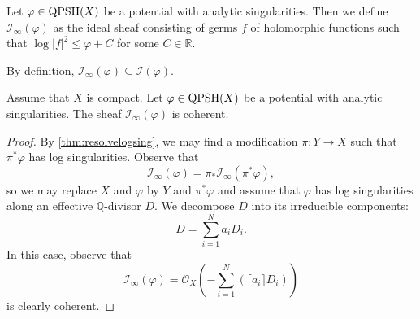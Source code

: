 \begin{definition}\label{def:Iinfty}
    Let $\varphi\in \mathrm{QPSH}(X)$ be a potential with analytic singularities. Then we define $\mathcal{I}_{\infty}(\varphi)$  as the ideal sheaf consisting of germs $f$ of holomorphic functions such that $\log |f|^2\leq \varphi+C$ for some $C\in \mathbb{R}$.
\end{definition}
By definition, $\mathcal{I}_{\infty}(\varphi)\subseteq \mathcal{I}(\varphi)$.

\begin{lemma}\label{lma:pshfunctions:L1494}
    Assume that $X$ is compact. Let $\varphi\in \mathrm{QPSH}(X)$ be a potential with analytic singularities.
    The sheaf $\mathcal{I}_{\infty}(\varphi)$ is coherent.
\end{lemma}
\begin{proof}
    By \cref{thm:resolvelogsing}, we may find a modification $\pi\colon Y\rightarrow X$ such that $\pi^*\varphi$ has log singularities. Observe that
    \[
        \mathcal{I}_{\infty}(\varphi)=\pi_*\mathcal{I}_{\infty}(\pi^*\varphi),
    \]
    so we may replace $X$ and $\varphi$ by $Y$ and $\pi^*\varphi$ and assume that $\varphi$ has log singularities along an effective $\mathbb{Q}$-divisor $D$. We decompose $D$ into its irreducible components:
    \[
        D=\sum_{i=1}^N a_iD_i.
    \]
    In this case, observe that
    \[
        \mathcal{I}_{\infty}(\varphi)=\mathcal{O}_X\left(-\sum_{i=1}^N\left(\lceil a_i \rceil D_i\right)\right)
    \]
    is clearly coherent.
\end{proof}

